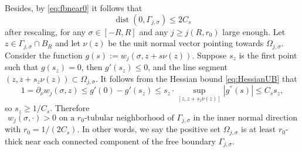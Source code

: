 \documentclass[11pt]{article}
\numberwithin{equation}{section}
\theoremstyle{definition}
\DeclareMathOperator{\dist}{dist}
\begin{document}
Besides, by \eqref{eq:fbnear0} it follows that 
\begin{equation}\label{eq:fbnear0-v}
    \dist(0, \Gamma_{j,\sigma}) \leq 2C_s
\end{equation}  
after rescaling, for any $\sigma \in [-R,R]$ and any $j\geq j(R,r_0)$ large enough.
Let $z\in \Gamma_{j,\sigma} \cap B_R $ and let $\nu(z)$ be the unit normal vector pointing towards $\Omega_{j,\sigma}$. Consider the function $g(s):= w_j(\sigma, z+s\nu(z))$. Suppose $s_z$ is the first point such that $g(s_z) = 0$, then $g'(s_z)\leq 0$, and the line segment $(z,z+s_z \nu(z)) \subset \Omega_{j,\sigma}$. It follows from the Hessian bound \eqref{eq:HessianUB} that
\[ 1= \partial_{\nu} w_j(\sigma, z) \leq g'(0) - g'(s_z) \leq s_z \cdot \sup_{[z,z+s_z \nu(z)]} | g^{''}(s)| \leq C_s s_z, \]
so $s_z \geq 1/C_s$. Therefore 
\begin{equation}\label{eq:thickness}
    w_j(\sigma, \cdot)>0 \text{ on a $r_0$-tubular neighborhood of $\Gamma_{j,\sigma}$ in the inner normal direction}
\end{equation} 
 with $r_0 = 1/(2C_s)$. In other words, we say the positive set $\Omega_{j,\sigma}$ is at least $r_0$-thick near each connected component of the free boundary $\Gamma_{j,\sigma}$.
\end{document}
